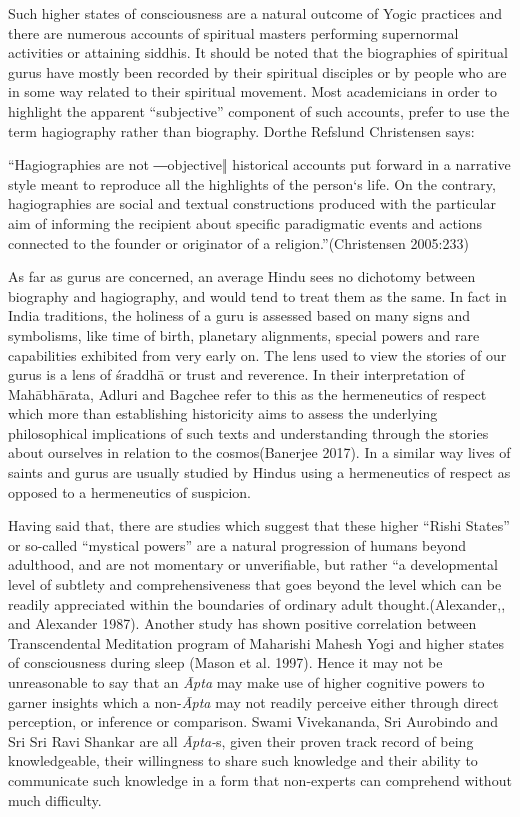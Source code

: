 Such higher states of consciousness are a natural outcome of Yogic practices and there are numerous accounts of spiritual masters performing supernormal activities or attaining siddhis. It should be noted that the biographies of spiritual gurus have mostly been recorded by their spiritual disciples or by people who are in some way related to their spiritual movement. Most academicians in order to highlight the apparent “subjective” component of such accounts, prefer to use the term hagiography rather than biography. Dorthe Refslund Christensen says:

\begin{myquote}
“Hagiographies are not ―objective‖ historical accounts put forward in a narrative style meant to reproduce all the highlights of the person‘s life. On the contrary, hagiographies are social and textual constructions produced with the particular aim of informing the recipient about specific paradigmatic events and actions connected to the founder or originator of a religion.”(Christensen 2005:233)
\end{myquote}

\newpage

As far as gurus are concerned, an average Hindu sees no dichotomy between biography and hagiography, and would tend to treat them as the same. In fact in India traditions, the holiness of a guru is assessed based on many signs and symbolisms, like time of birth, planetary alignments, special powers and rare capabilities exhibited from very early on. The lens used to view the stories of our gurus is a lens of śraddhā or trust and reverence. In their interpretation of Mahābhārata, Adluri and Bagchee refer to this as the hermeneutics of respect which more than establishing historicity aims to assess the underlying philosophical implications of such texts and understanding through the stories about ourselves in relation to the cosmos(Banerjee 2017). In a similar way lives of saints and gurus are usually studied by Hindus using a hermeneutics of respect as opposed to a hermeneutics of suspicion.

Having said that, there are studies which suggest that these higher “Rishi States” or so-called “mystical powers” are a natural progression of humans beyond adulthood, and are not momentary or unverifiable, but rather “a developmental level of subtlety and comprehensiveness that goes beyond the level which can be readily appreciated within the boundaries of ordinary adult thought.(Alexander,, and Alexander 1987). Another study has shown positive correlation between Transcendental Meditation program of Maharishi Mahesh Yogi and higher states of consciousness during sleep (Mason et al. 1997). Hence it may not be unreasonable to say that an \textit{Āpta} may make use of higher cognitive powers to garner insights which a non-\textit{Āpta} may not readily perceive either through direct perception, or inference or comparison. Swami Vivekananda, Sri Aurobindo and Sri Sri Ravi Shankar are all \textit{Āpta-}s, given their proven track record of being knowledgeable, their willingness to share such knowledge and their ability to communicate such knowledge in a form that non-experts can comprehend without much difficulty.


